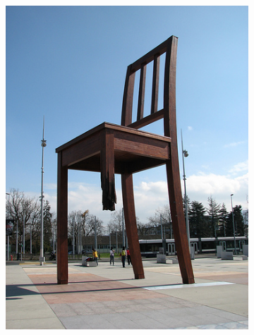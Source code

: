 \begin{figure}[H]
\begin{subfigure}[b]{0.2\textwidth}
        \includegraphics[width=\textwidth]{Figs/Problem/chair3.jpeg}
        \caption{}
    \end{subfigure}
    \begin{subfigure}[b]{0.2\textwidth}
        \center

\end{subfigure}
\end{figure}
